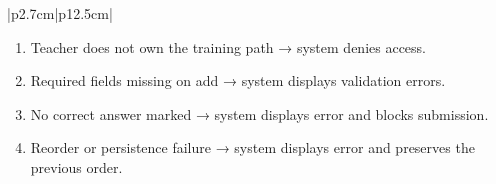 \begin{table}[H]
\begin{tabular}{|p{2.7cm}|p{12.5cm}|}
\begin{minipage}[t]{\linewidth}
\begin{enumerate}[topsep=0pt,itemsep=1pt,parsep=0pt,partopsep=0pt]
                \item Teacher does not own the training path → system denies access.
                \item Required fields missing on add → system displays validation errors.
                \item No correct answer marked → system displays error and blocks submission.
                \item Reorder or persistence failure → system displays error and preserves the previous order.
            \end{enumerate}
        \end{minipage} \\
        \hline
    \end{tabular}
    \label{tab:teacher-manage-questions}
\end{table}
 
